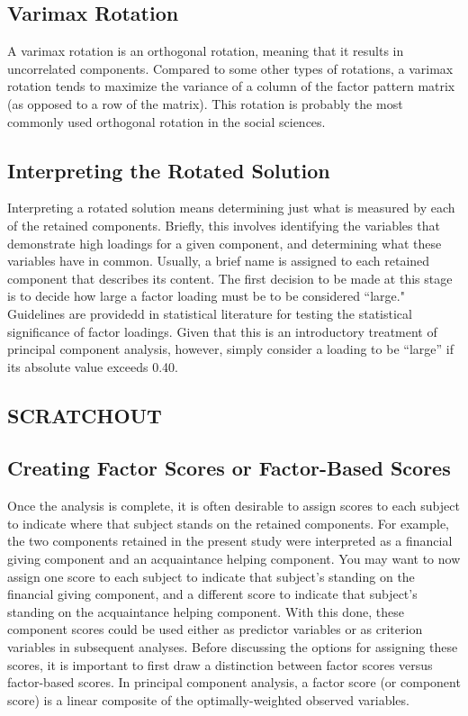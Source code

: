 \subsection{Varimax Rotation}
A varimax rotation is an orthogonal rotation, meaning that
it results in uncorrelated components. Compared to some other types of rotations, a varimax
rotation tends to maximize the variance of a column of the factor pattern matrix (as opposed to a
row of the matrix). This rotation is probably the most commonly used orthogonal rotation in the
social sciences.

\subsection{Interpreting the Rotated Solution}

Interpreting a rotated solution means determining just what is measured by each of the retained
components. Briefly, this involves identifying the variables that demonstrate high loadings for a
given component, and determining what these variables have in common. Usually, a brief name
is assigned to each retained component that describes its content.
The first decision to be made at this stage is to decide how large a factor loading must be to be
considered ``large."
Guidelines are providedd in statistical literature for testing the statistical significance of factor loadings. Given that this
is an introductory treatment of principal component analysis, however, simply consider a loading
to be “large” if its absolute value exceeds 0.40.

\subsection{SCRATCHOUT}


\subsection{Creating Factor Scores or Factor-Based Scores}

Once the analysis is complete, it is often desirable to assign scores to each subject to indicate
where that subject stands on the retained components. For example, the two components
retained in the present study were interpreted as a financial giving component and an
acquaintance helping component. You may want to now assign one score to each subject to
indicate that subject’s standing on the financial giving component, and a different score to
indicate that subject’s standing on the acquaintance helping component. With this done, these
component scores could be used either as predictor variables or as criterion variables in
subsequent analyses.
Before discussing the options for assigning these scores, it is important to first draw a distinction
between factor scores versus factor-based scores. In principal component analysis, a factor
score (or component score) is a linear composite of the optimally-weighted observed variables.

